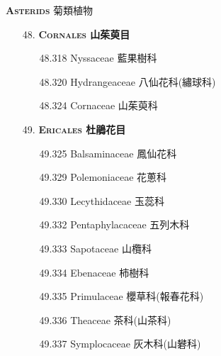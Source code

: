 \vspace{2ex} 
\noindent \normalsize\textsc{\textbf{Asterids} 菊類植物}\selectfont \\
\footnotesize\selectfont
\begin{enumerate}
  \item[48. ] \textbf{\textsc{Cornales} 山茱萸目}   
    \begin{enumerate}
      \item[48.318] Nyssaceae 藍果樹科     
        
      \item[48.320] Hydrangeaceae 八仙花科(繡球科)     
        
      \item[48.324] Cornaceae 山茱萸科     
        
    \end{enumerate}
  \item[49. ] \textbf{\textsc{Ericales} 杜鵑花目}   
    \begin{enumerate}
      \item[49.325] Balsaminaceae 鳳仙花科     
        
      \item[49.329] Polemoniaceae 花蔥科     
        
      \item[49.330] Lecythidaceae 玉蕊科     
        
      \item[49.332] Pentaphylacaceae 五列木科     
        
      \item[49.333] Sapotaceae 山欖科     
        
      \item[49.334] Ebenaceae 柿樹科     
        
      \item[49.335] Primulaceae 櫻草科(報春花科)     
        
      \item[49.336] Theaceae 茶科(山茶科)     
        
      \item[49.337] Symplocaceae 灰木科(山礬科)     

\end{enumerate}
\end{enumerate}
